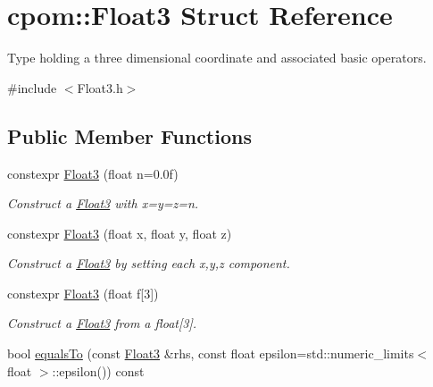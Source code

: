 \hypertarget{structcpom_1_1_float3}{}\section{cpom\+:\+:Float3 Struct Reference}
\label{structcpom_1_1_float3}


Type holding a three dimensional coordinate and associated basic operators.  




{\ttfamily \#include $<$Float3.\+h$>$}

\subsection*{Public Member Functions}
\begin{DoxyCompactItemize}
\item 
constexpr \hyperlink{structcpom_1_1_float3_a1f26ece02fd3877dcf565b278cc7c5b3}{Float3} (float n=0.\+0f)\hypertarget{structcpom_1_1_float3_a1f26ece02fd3877dcf565b278cc7c5b3}{}\label{structcpom_1_1_float3_a1f26ece02fd3877dcf565b278cc7c5b3}

\begin{DoxyCompactList}\small\item\em Construct a \hyperlink{structcpom_1_1_float3}{Float3} with x=y=z=n. \end{DoxyCompactList}\item 
constexpr \hyperlink{structcpom_1_1_float3_a2e9b6a4018537e8ea949383a4014bca8}{Float3} (float x, float y, float z)\hypertarget{structcpom_1_1_float3_a2e9b6a4018537e8ea949383a4014bca8}{}\label{structcpom_1_1_float3_a2e9b6a4018537e8ea949383a4014bca8}

\begin{DoxyCompactList}\small\item\em Construct a \hyperlink{structcpom_1_1_float3}{Float3} by setting each x,y,z component. \end{DoxyCompactList}\item 
constexpr \hyperlink{structcpom_1_1_float3_a301415f51723ddb14d357fe967420708}{Float3} (float f\mbox{[}3\mbox{]})\hypertarget{structcpom_1_1_float3_a301415f51723ddb14d357fe967420708}{}\label{structcpom_1_1_float3_a301415f51723ddb14d357fe967420708}

\begin{DoxyCompactList}\small\item\em Construct a \hyperlink{structcpom_1_1_float3}{Float3} from a float\mbox{[}3\mbox{]}. \end{DoxyCompactList}\item 
bool \hyperlink{structcpom_1_1_float3_ab6843f9fe9197413ecc3da03f9835de3}{equals\+To} (const \hyperlink{structcpom_1_1_float3}{Float3} \&rhs, const float epsilon=std\+::numeric\+\_\+limits$<$ float $>$\+::epsilon()) const \hypertarget{structcpom_1_1_float3_ab6843f9fe9197413ecc3da03f9835de3}{}\label{structcpom_1_1_float3_ab6843f9fe9197413ecc3da03f9835de3}


\end{DoxyCompactItemize}
